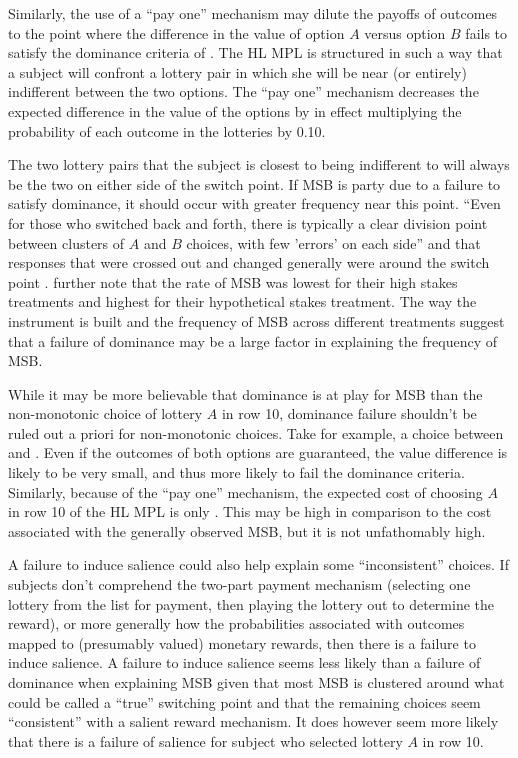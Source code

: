\documentclass[../main.tex]{subfiles}
\begin{document}
Similarly, the use of a \enquote{pay one} mechanism may dilute the payoffs of outcomes to the point where the difference in the value of option $A$ versus option $B$ fails to satisfy the dominance criteria of \textcite{Smith1982}.
The HL MPL is structured in such a way that a subject will confront a lottery pair in which she will be near (or entirely) indifferent between the two options.
The \enquote{pay one} mechanism decreases the expected difference in the value of the options by in effect multiplying the probability of each outcome in the lotteries by 0.10. 

The two lottery pairs that the subject is closest to being indifferent to will always be the two on either side of the switch point.
If MSB is party due to a failure to satisfy dominance, it should occur with greater frequency near this point.
\textcite[1648]{Holt2002} \enquote{Even for those who switched back and forth, there is typically a clear division point between clusters of $A$ and $B$ choices, with few 'errors' on each side} and that responses that were crossed out and changed generally were around the switch point \parencite*[1646]{Holt2002}.
\textcite[1647-1648]{Holt2002} further note that the rate of MSB was lowest for their high stakes treatments and highest for their hypothetical stakes treatment.
The way the instrument is built and the frequency of MSB across different treatments suggest that a failure of dominance may be a large factor in explaining the frequency of MSB.

While it may be more believable that dominance is at play for MSB than the non-monotonic choice of lottery $A$ in row 10, dominance failure shouldn't be ruled out a priori for non-monotonic choices.
Take for example, a choice between  and .
Even if the outcomes of both options are guaranteed, the value difference is likely to be very small, and thus more likely to fail the dominance criteria.
Similarly, because of the \enquote{pay one} mechanism, the expected cost of choosing $A$ in row 10 of the HL MPL is only .
This may be high in comparison to the cost associated with the generally observed MSB, but it is not unfathomably high.

A failure to induce salience could also help explain some \enquote{inconsistent} choices.
If subjects don't comprehend the two-part payment mechanism (selecting one lottery from the list for payment, then playing the lottery out to determine the reward), or more generally how the probabilities associated with outcomes mapped to (presumably valued) monetary rewards, then there is a failure to induce salience.
A failure to induce salience seems less likely than a failure of dominance when explaining MSB given that most MSB is clustered around what could be called a \enquote{true} switching point and that the remaining choices seem \enquote{consistent} with a salient reward mechanism.
It does however seem more likely that there is a failure of salience for subject who selected lottery $A$ in row 10.
\end{document}
